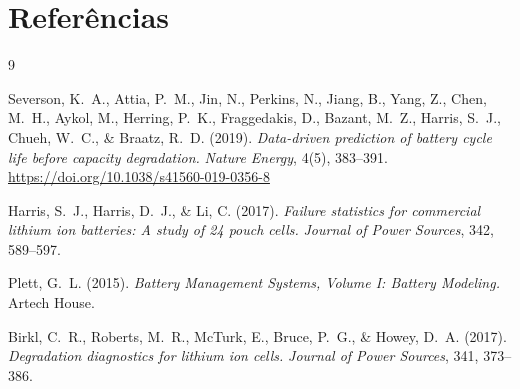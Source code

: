 \documentclass[12pt, a4paper]{article}
\begin{document}
\section*{Referências}

\begin{thebibliography}{9}

Severson, K.~A., Attia, P.~M., Jin, N., Perkins, N., Jiang, B.,
Yang, Z., Chen, M.~H., Aykol, M., Herring, P.~K., Fraggedakis, D.,
Bazant, M.~Z., Harris, S.~J., Chueh, W.~C., \& Braatz, R.~D. (2019).
\textit{Data-driven prediction of battery cycle life before capacity
degradation.}
\textit{Nature Energy}, 4(5), 383--391.
\url{https://doi.org/10.1038/s41560-019-0356-8}

Harris, S.~J., Harris, D.~J., \& Li, C. (2017).
\textit{Failure statistics for commercial lithium ion batteries: A study
of 24 pouch cells.}
\textit{Journal of Power Sources}, 342, 589--597.

Plett, G.~L. (2015).
\textit{Battery Management Systems, Volume I: Battery Modeling.}
Artech House.

Birkl, C.~R., Roberts, M.~R., McTurk, E., Bruce, P.~G., \& Howey, D.~A.
(2017).
\textit{Degradation diagnostics for lithium ion cells.}
\textit{Journal of Power Sources}, 341, 373--386.

\end{thebibliography}
\end{document}
